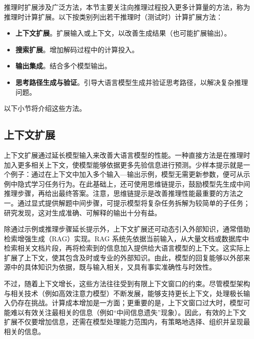 推理时扩展涉及广泛方法，本节主要关注向推理过程投入更多计算量的方法，称为推理时计算扩展。以下按类别列出若干推理时（测试时）计算扩展方法：

\begin{itemize}
    \item \vspace{0.5em} \textbf{上下文扩展}。扩展输入或上下文，以改善生成结果（也可能扩展输出）。
    \item \vspace{0.3em} \textbf{搜索扩展}。增加解码过程中的计算投入。
    \item \vspace{0.3em} \textbf{输出集成}。结合多个模型输出。
    \item \vspace{0.3em} \textbf{思考路径生成与验证}。引导大语言模型生成并验证思考路径，以解决复杂推理问题。
    \end{itemize}
    \vspace{0.5em}

以下小节将介绍这些方法。

\subsection{上下文扩展}

上下文扩展通过延长模型输入来改善大语言模型的性能。一种直接方法是在推理时加入更多相关上下文，使模型能够依据更多先验信息进行预测。少样本提示就是一个例子：通过在上下文中加入多个输入—输出示例，模型无需更新参数，便可从示例中隐式学习任务行为。在此基础上，还可使用思维链提示，鼓励模型先生成中间推理步骤，再给出最终答案。注意，思维链提示是改善推理性能最重要的方法之一。通过显式提供解题中间步骤，可提示模型将复杂任务拆解为较简单的子任务；研究发现，这对生成准确、可解释的输出十分有益。

除通过示例或推理步骤延长提示外，上下文扩展还可动态引入外部知识，通常借助检索增强生成（RAG）实现。RAG 系统先依据当前输入，从大量文档或数据库中检索相关文档片段，再将检索到的信息加入提供给大语言模型的上下文。这实际上扩展了上下文，使其包含及时或专业的外部知识。由此，模型的回复能够以外部来源中的具体知识为依据，既与输入相关，又具有事实准确性与时效性。

不过，随着上下文增长，这些方法往往受到有限上下文窗口的约束。尽管模型架构与相关技术（例如高效注意力模型）不断发展，能够支持更长上下文，处理极长输入仍存在挑战。计算成本增加是一方面；更重要的是，上下文窗口过大时，模型可能难以有效关注最相关的信息（例如“中间信息遗失”现象）。因此，有效的上下文扩展不仅要增加信息，还需在模型处理能力范围内，有策略地选择、组织并呈现最相关的信息。


